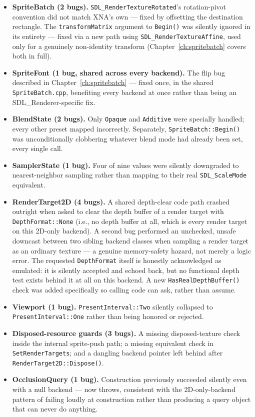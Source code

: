 \begin{itemize}
  \item \textbf{SpriteBatch (2 bugs).} \texttt{SDL\_RenderTextureRotated}'s rotation-pivot
        convention did not match XNA's own --- fixed by offsetting the destination
        rectangle. The \texttt{transformMatrix} argument to \texttt{Begin()} was silently
        ignored in its entirety --- fixed via a new path using
        \texttt{SDL\_RenderTextureAffine}, used only for a genuinely non-identity transform
        (Chapter~\ref{ch:spritebatch} covers both in full).
  \item \textbf{SpriteFont (1 bug, shared across every backend).} The
         flip bug described in Chapter~\ref{ch:spritebatch} ---
        fixed once, in the shared \texttt{SpriteBatch.cpp}, benefiting every backend at
        once rather than being an SDL\_Renderer-specific fix.
  \item \textbf{BlendState (2 bugs).} Only \texttt{Opaque} and \texttt{Additive} were
        specially handled; every other preset mapped incorrectly. Separately,
        \texttt{SpriteBatch::Begin()} was unconditionally clobbering whatever blend mode had
        already been set, every single call.
  \item \textbf{SamplerState (1 bug).} Four of nine  values were
        silently downgraded to nearest-neighbor sampling rather than mapping to their real
        \texttt{SDL\_ScaleMode} equivalent.
  \item \textbf{RenderTarget2D (4 bugs).} A shared depth-clear code path crashed outright
        when asked to clear the depth buffer of a render target with
        \texttt{DepthFormat::None} (i.e., no depth buffer at all, which is every render
        target on this 2D-only backend). A second bug performed an unchecked, unsafe
        downcast between two sibling backend classes when sampling a render target as an
        ordinary texture --- a genuine memory-safety hazard, not merely a logic error. The
        requested \texttt{DepthFormat} itself is honestly acknowledged as emulated: it is
        silently accepted and echoed back, but no functional depth test exists behind it at
        all on this backend. A new \texttt{HasRealDepthBuffer()} check was added specifically
        so calling code can ask, rather than assume.
  \item \textbf{Viewport (1 bug).} \texttt{PresentInterval::Two} silently collapsed to
        \texttt{PresentInterval::One} rather than being honored or rejected.
  \item \textbf{Disposed-resource guards (3 bugs).} A missing disposed-texture check inside
        the internal sprite-push path; a missing equivalent check in
        \texttt{SetRenderTargets}; and a dangling backend pointer left behind after
        \texttt{RenderTarget2D::Dispose()}.
  \item \textbf{OcclusionQuery (1 bug).} Construction previously succeeded silently even with
        a null backend --- now throws, consistent with the 2D-only-backend pattern of
        failing loudly at construction rather than producing a query object that can never
        do anything.
\end{itemize}

